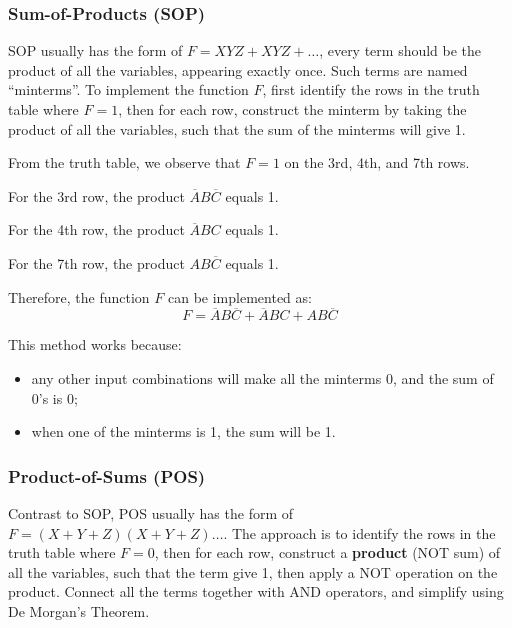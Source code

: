\subsubsection{Sum-of-Products (SOP)}

SOP usually has the form of $F = XYZ + XYZ + \dots$, every term should be the product
of all the variables, appearing exactly once. Such terms are named ``minterms''.
To implement the function $F$, first identify the rows in the truth table where $F=1$,
then for each row, construct the minterm by taking the product of all the variables,
such that the sum of the minterms will give 1.

\begin{example}
    From the truth table, we observe that $F=1$ on the 3rd, 4th, and 7th rows.
    
    For the 3rd row, the product $\overline{A}B\overline{C}$ equals 1.

    For the 4th row, the product $\overline{A}BC$ equals 1.

    For the 7th row, the product $AB\overline{C}$ equals 1.

    Therefore, the function $F$ can be implemented as:
    \begin{equation*}
        F = \overline{A}B\overline{C} + \overline{A}BC + AB\overline{C}
    \end{equation*}
\end{example}

This method works because:
\begin{itemize}
    \item any other input combinations will make all the minterms 0, and the sum of 0's is 0;
    \item when one of the minterms is 1, the sum will be 1.
\end{itemize}

\subsubsection{Product-of-Sums (POS)}

Contrast to SOP, POS usually has the form of $F = (X+Y+Z)(X+Y+Z)\dots$.
The approach is to identify the rows in the truth table where $F=0$,
then for each row, construct a \textbf{product} (NOT sum) of all the variables,
such that the term give 1, then apply a NOT operation on the product. Connect all the terms
together with AND operators, and simplify using De Morgan's Theorem.

